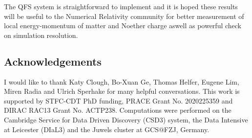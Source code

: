 The QFS system is straightforward to implement and it is hoped these results will be useful to the Numerical Relativity community for better measurement of local energy-momentum of matter and Noether charge aswell as powerful check on simulation resolution.


\subsection*{Acknowledgements} \label{sect:thanks}
I would like to thank Katy Clough, Bo-Xuan Ge, Thomas Helfer, Eugene Lim, Miren Radia and Ulrich Sperhake for many helpful conversations. This work is supported by STFC-CDT PhD funding, PRACE Grant No. 2020225359 and DIRAC RAC13 Grant
No. ACTP238. Computations were performed on the Cambridge Service for Data Driven Discovery (CSD3) system, the Data Intensive at Leicester (DIaL3) and the Juwels cluster at GCS@FZJ, Germany. 






